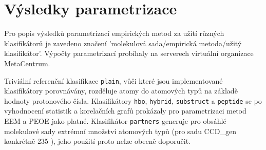 \section{Výsledky parametrizace}
Pro popis výsledků parametrizací empirických metod za užití různých klasifikátorů je zavedeno značení 'molekulová sada/empirická metoda/užitý klasifikátor'. Výpočty  parametrizací probíhaly na serverech virtuální organizace MetaCentrum. 

Triviální referenční klasifikace \verb|plain|, vůči které jsou implementované klasifikátory porovnávány, rozděluje atomy do atomových typů na základě hodnoty protonového čísla. Klasifikátory \verb|hbo|, \verb|hybrid|, \verb|substruct| a \verb|peptide| se po vyhodnocení statistik a korelačních grafů prokázaly pro parametrizaci metod EEM a PEOE jako platné. 
Klasifikátor \verb|partners| generuje pro obsáhlé molekulové sady extrémní množství atomových typů (pro sadu CCD\_gen konkrétně 235%
), jeho použití proto nelze obecně doporučit. 


